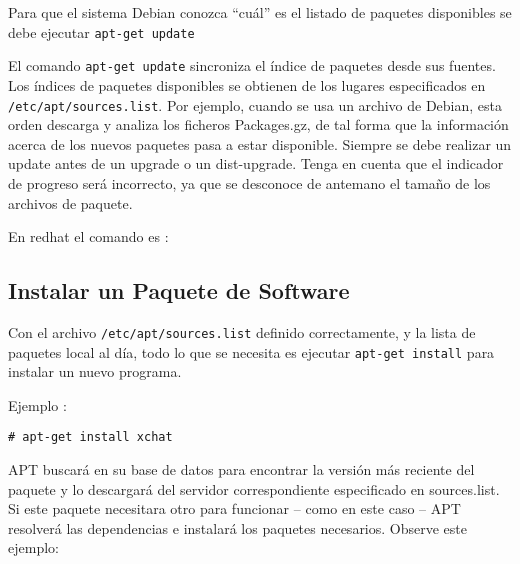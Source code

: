 \documentclass[12pt]{article}
\begin{document}
Para que el sistema Debian conozca ``cuál'' es el listado de paquetes disponibles se debe ejecutar \texttt{apt-get update}

El comando \texttt{apt-get update} sincroniza el índice de paquetes desde sus
           fuentes. Los índices de paquetes disponibles se obtienen de los
           lugares especificados en \texttt{/etc/apt/sources.list}. Por ejemplo, cuando
           se usa un archivo de Debian, esta orden descarga y analiza los
           ficheros Packages.gz, de tal forma que la información acerca de los
           nuevos paquetes pasa a estar disponible. Siempre se debe realizar
           un update antes de un upgrade o un dist-upgrade. Tenga en cuenta
           que el indicador de progreso será incorrecto, ya que se desconoce
           de antemano el tamaño de los archivos de paquete.




En redhat el comando es :

\subsection*{Instalar un Paquete de Software}

Con el archivo \texttt{/etc/apt/sources.list} definido correctamente, y la lista de paquetes local al día, todo lo
que se necesita es ejecutar \texttt{apt-get install} para instalar un nuevo programa.

Ejemplo :

{\tt     \# apt-get install xchat}

APT buscará en su base de datos para encontrar la versión más reciente del paquete y lo descargará del servidor correspondiente especificado en sources.list. 
Si este paquete necesitara otro para funcionar -- como en este caso -- APT resolverá las dependencias e instalará los paquetes necesarios. Observe este ejemplo:
\end{document}
